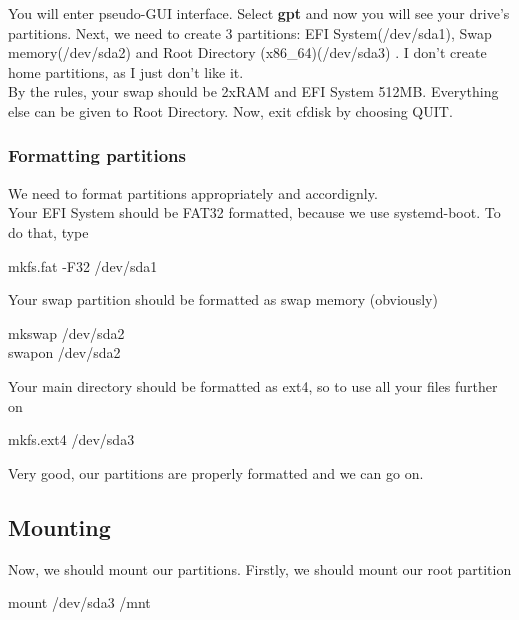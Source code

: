 \documentclass{article}
\begin{document}
You will enter pseudo-GUI interface. Select \textbf{gpt} and now you will see your drive's partitions. Next, we need to create 3 partitions: EFI System(/dev/sda1), Swap memory(/dev/sda2) and Root Directory (x86\_64)(/dev/sda3) . I don't create home partitions, as I just don't like it.\\

By the rules, your swap should be 2xRAM and EFI System 512MB. Everything else can be given to Root Directory. Now, exit cfdisk by choosing QUIT.\\

\subsubsection{Formatting partitions}

We need to format partitions appropriately and accordignly.\\

Your EFI System should be FAT32 formatted, because we use systemd-boot. To do that, type

\begin{center}
mkfs.fat -F32 /dev/sda1\\
\end{center}

Your swap partition should be formatted as swap memory (obviously)

\begin{center}
  mkswap /dev/sda2\\
  swapon /dev/sda2\\
  \end{center}

Your main directory should be formatted as ext4, so to use all your files further on

\begin{center}
  mkfs.ext4 /dev/sda3\\
  \end{center}

Very good, our partitions are properly formatted and we can go on.

\subsection{Mounting}

Now, we should mount our partitions. Firstly, we should mount our root partition

\begin{center}
  mount /dev/sda3 /mnt
\end{center}
\end{document}
